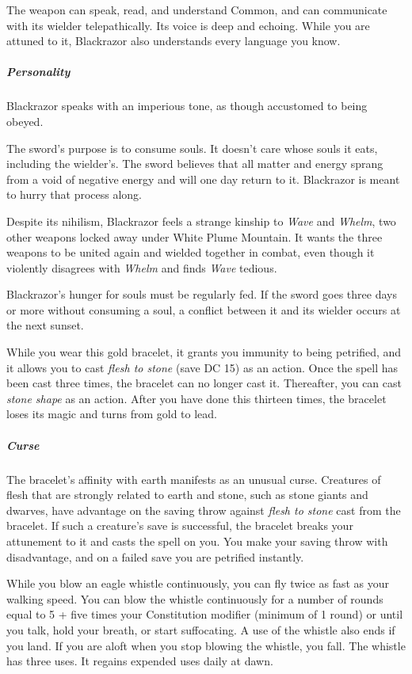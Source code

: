 \documentclass[10pt,a4paper,twoside,bg=print,twocolumn,openany,nodeprecatedcode]{dndbook}
\begin{document}
The weapon can speak, read, and understand Common, and can communicate with its wielder telepathically. Its voice is deep and echoing. While you are attuned to it, Blackrazor also understands every language you know.

\subparagraph{Personality}
Blackrazor speaks with an imperious tone, as though accustomed to being obeyed.

The sword's purpose is to consume souls. It doesn't care whose souls it eats, including the wielder's. The sword believes that all matter and energy sprang from a void of negative energy and will one day return to it. Blackrazor is meant to hurry that process along.

Despite its nihilism, Blackrazor feels a strange kinship to \textit{Wave} and \textit{Whelm}, two other weapons locked away under White Plume Mountain. It wants the three weapons to be united again and wielded together in combat, even though it violently disagrees with \textit{Whelm} and finds \textit{Wave} tedious.

Blackrazor's hunger for souls must be regularly fed. If the sword goes three days or more without consuming a soul, a conflict between it and its wielder occurs at the next sunset.

While you wear this gold bracelet, it grants you immunity to being petrified, and it allows you to cast \textit{flesh to stone} (save DC 15) as an action. Once the spell has been cast three times, the bracelet can no longer cast it. Thereafter, you can cast \textit{stone shape} as an action. After you have done this thirteen times, the bracelet loses its magic and turns from gold to lead.

\subparagraph{Curse}
The bracelet's affinity with earth manifests as an unusual curse. Creatures of flesh that are strongly related to earth and stone, such as stone giants and dwarves, have advantage on the saving throw against \textit{flesh to stone} cast from the bracelet. If such a creature's save is successful, the bracelet breaks your attunement to it and casts the spell on you. You make your saving throw with disadvantage, and on a failed save you are petrified instantly.

While you blow an eagle whistle continuously, you can fly twice as fast as your walking speed. You can blow the whistle continuously for a number of rounds equal to 5 + five times your Constitution modifier (minimum of 1 round) or until you talk, hold your breath, or start suffocating. A use of the whistle also ends if you land. If you are aloft when you stop blowing the whistle, you fall. The whistle has three uses. It regains expended uses daily at dawn.
\end{document}

